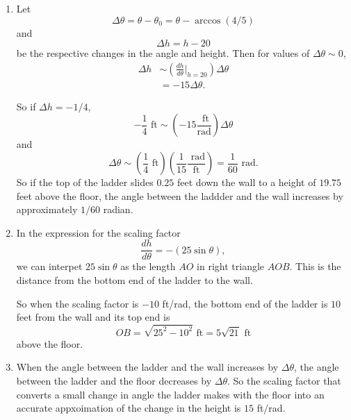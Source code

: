 \documentclass{ximera}
\begin{document}
\begin{question}
\begin{explanation}
\begin{enumerate}
The units of the scaling factor are ft/rad. 

\emph{Interpretation:} When the top of the ladder is $20$ feet above the floor, increasing the angle between the ladder and the wall by $0.1$ radians decreases the height of the ladder's top end by approximate $1.5$ feet.

\item Let 
\[
   \Delta \theta = \theta - \theta_0 = \theta - \arccos(4/5)
\]
and
\[
 \Delta h = h - 20
\]
be the respective changes in the angle and height. Then for values of $\Delta \theta \sim 0$, 
\begin{align*}
    \Delta h   & \sim \left( \frac{dh}{d\theta}\Big|_{h=20} \right) \Delta \theta \\
                  &= -15 \Delta \theta .
\end{align*}

So if $\Delta h = -1/4$,
\[
           -\frac{1}{4}\text{ ft}  \sim  \left( -15 \frac{\text{ ft}}{\text{rad}} \right) \Delta \theta   
\]
and
\[
   \Delta \theta \sim  \left( \frac{1}{4} \text{ ft}\right) \left( \frac{1}{15} \frac{\text{ rad}}{\text{ft}}  \right) = \frac{1}{60} \text{ rad}.
\]
So if the top of the ladder slides $0.25$ feet down the wall to a height of $19.75$ feet above the floor, the angle between the laddder and the wall increases by approximately $1/60$ radian.

\item In the expression for the scaling factor 
\[
       \frac{dh}{d\theta} = - (25\sin\theta) ,
\]
we can interpet $25\sin\theta$ as the length $AO$ in right triangle $AOB$. This is the distance from the bottom end of the ladder to the wall.

So when the scaling factor is $-10$ ft/rad, the bottom end of the ladder is $10$ feet from the wall and its top end is
\[
   OB = \sqrt{25^2 - 10^2}\text{ ft} = 5 \sqrt{21} \text{ ft}
\]
above the floor.

\item When the angle between the ladder and the wall increases by $\Delta \theta$, the angle between the ladder and the floor decreases by $\Delta \theta$. So the scaling factor that converts a small change in angle the ladder makes with the floor into an accurate appxoimation of the change in the height is $15$ ft/rad.

\end{enumerate}
\end{explanation}


\end{question}
\end{document}
